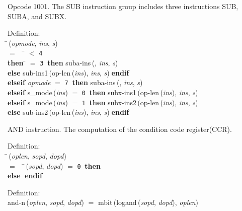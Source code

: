  Opcode 1001.
 The SUB instruction group includes three instructions SUB, SUBA, and SUBX.
\begin{tabbing}{\sc Definition}: \\  
\=\,({\it{opmode\/}}, {\it{ins\/}}, {\it{s\/}}) \\ 
$=$$\;\;\;\;$\= $<$ {\tt{4}} \\ 
{\bf then }\= $=$ {\tt{3}}$\;\;${\bf then }{\rm{suba-ins}}\,({}, {\it{ins\/}}, {\it{s\/}}) \\ 
{\bf else }{\rm{sub-ins1}}\,({\rm{op-len}}\,({\it{ins\/}}), {\it{ins\/}}, {\it{s\/}})$\;${\bf  endif}\- \\ 
{\bf elseif }{\it{opmode\/}} $=$ {\tt{7}}$\;\;${\bf then }{\rm{suba-ins}}\,({}, {\it{ins\/}}, {\it{s\/}}) \\ 
{\bf elseif }{\rm{s\_mode}}\,({\it{ins\/}}) $=$ {\tt{0}}$\;\;${\bf then }{\rm{subx-ins1}}\,({\rm{op-len}}\,({\it{ins\/}}), {\it{ins\/}}, {\it{s\/}}) \\ 
{\bf elseif }{\rm{s\_mode}}\,({\it{ins\/}}) $=$ {\tt{1}}$\;\;${\bf then }{\rm{subx-ins2}}\,({\rm{op-len}}\,({\it{ins\/}}), {\it{ins\/}}, {\it{s\/}}) \\ 
{\bf else }{\rm{sub-ins2}}\,({\rm{op-len}}\,({\it{ins\/}}), {\it{ins\/}}, {\it{s\/}})$\;${\bf  endif}\-\-
\end{tabbing}

 AND instruction.
 The computation of the condition code register(CCR).
\begin{tabbing}{\sc Definition}: \\  
\=\,({\it{oplen\/}}, {\it{sopd\/}}, {\it{dopd\/}}) \\ 
$=$$\;\;\;\;$\=\,({\it{sopd\/}}, {\it{dopd\/}}) $=$ {\tt{0}}$\;\;${\bf then }{} \\ 
{\bf else }{}$\;${\bf  endif}\-\-
\end{tabbing}

\begin{tabbing}{\sc Definition}: \\  
{\rm{and-n}}\,({\it{oplen\/}}, {\it{sopd\/}}, {\it{dopd\/}}) $=$ {\rm{mbit}}\,({\rm{logand}}\,({\it{sopd\/}}, {\it{dopd\/}}), {\it{oplen\/}})
\end{tabbing}

